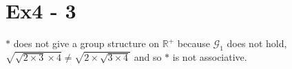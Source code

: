\section*{Ex4 - 3}
$ * $ does not give a group structure on $ \mathbb{R}^+ $ because $ \mathscr{G}_1 $ does not hold, $ \sqrt{\sqrt{2\times3} \times 4} \ne \sqrt{2 \times \sqrt{3 \times 4}} $ and so $ * $ is not associative.